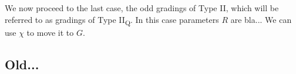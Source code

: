 We now proceed to the last case, the odd gradings of Type II, which will be referred to as gradings of Type II\textsubscript{Q}. 
In this case parameters $R$ are bla...
We can use $\chi$ to move it to $G$. 




\subsection{Old...}






